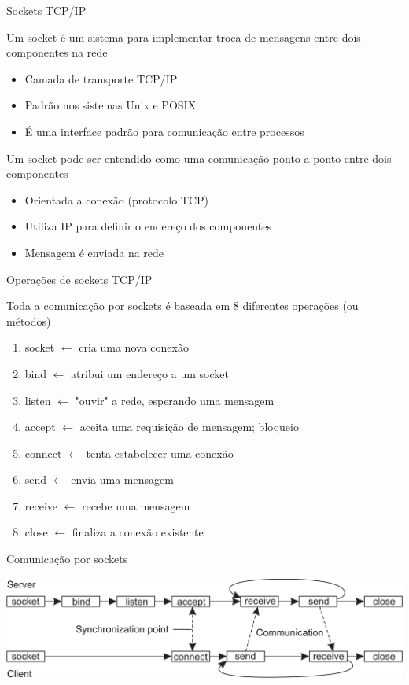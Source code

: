 \documentclass[compress]{beamer}
\begin{document}
\begin{frame}{Sockets TCP/IP}

Um socket é um sistema para implementar troca de mensagens entre dois componentes na rede
\begin{itemize}
    \item Camada de transporte TCP/IP
    \item Padrão nos sistemas Unix e POSIX
    \item É uma interface padrão para comunicação entre processos
\end{itemize}

\vspace{0.75cm}

Um socket pode ser entendido como uma comunicação ponto-a-ponto entre dois componentes
\begin{itemize}
    \item Orientada a conexão (protocolo TCP)
    \item Utiliza IP para definir o endereço dos componentes
    \item Mensagem é enviada na rede
\end{itemize}
\end{frame}


\begin{frame}{Operações de sockets TCP/IP}

Toda a comunicação por sockets é baseada em 8 diferentes operações (ou métodos)

\begin{enumerate}
    \item socket \textcolor{sthlmDarkBlue}{$\leftarrow$} cria uma nova conexão
    \item bind \textcolor{sthlmDarkBlue}{$\leftarrow$} atribui um endereço a um socket
    \item listen \textcolor{sthlmDarkBlue}{$\leftarrow$} "ouvir" a rede, esperando uma mensagem
    \item accept \textcolor{sthlmDarkBlue}{$\leftarrow$} aceita uma requisição de mensagem; bloqueio
    \item connect \textcolor{sthlmDarkBlue}{$\leftarrow$} tenta estabelecer uma conexão
    \item send \textcolor{sthlmDarkBlue}{$\leftarrow$} envia uma mensagem
    \item receive \textcolor{sthlmDarkBlue}{$\leftarrow$} recebe uma mensagem
    \item close \textcolor{sthlmDarkBlue}{$\leftarrow$} finaliza a conexão existente
\end{enumerate}

\end{frame}


\begin{frame}{Comunicação por sockets}

\vspace{1cm}

\centering \includegraphics[width=\textwidth]{images/sockets.png}
\end{frame}
\end{document}
